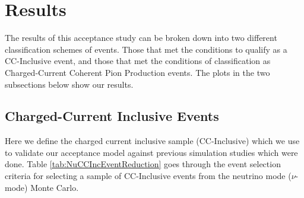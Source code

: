 \documentclass[11pt]{article}
\begin{document}
\section{Results}\label{sec:Results}
The results of this acceptance study can be broken down into two different classification schemes of events. Those that met the conditions to qualify as a CC-Inclusive event, and those that met the conditions of classification as Charged-Current Coherent Pion Production events. The plots in the two subsections below show our results.

\subsection{Charged-Current Inclusive Events}\label{sub:CCInclusive}

Here we define the charged current inclusive sample (CC-Inclusive) which we use to validate our acceptance model against previous simulation studies which were done. Table \ref*{tab:NuCCIncEventReduction} goes through the event selection criteria for selecting a sample of CC-Inclusive events from the neutrino mode ($\nu$-mode) Monte Carlo.
\end{document}
